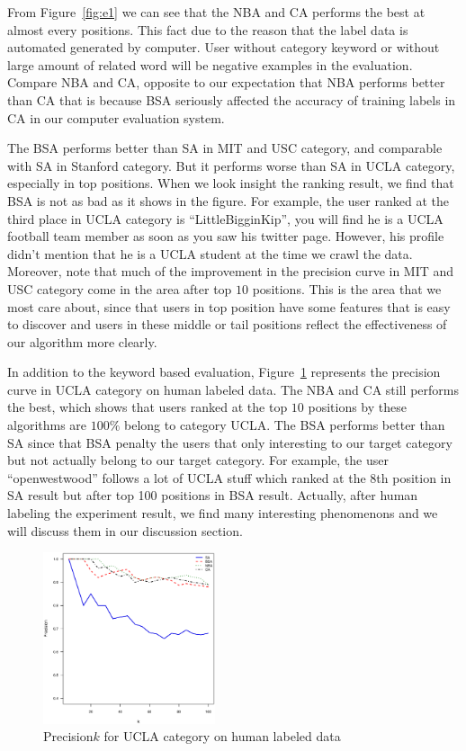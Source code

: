 \documentclass{article}
\begin{document}
From Figure~\ref{fig:e1} we can see that the NBA and CA performs the best at almost every positions. This fact due to the reason that the label data is automated generated by computer. User without category keyword or without large amount of related word will be negative examples in the evaluation. Compare NBA and CA, opposite to our expectation that NBA performs better than CA that is because BSA seriously affected the accuracy of training labels in CA in our computer evaluation system.

The BSA performs better than SA in MIT and USC category, and comparable with SA in Stanford category. But it performs worse than SA in UCLA category, especially in top positions. When we look insight the ranking result, we find that BSA is not as bad as it shows in the figure. For example, the user ranked at the third place in UCLA category is ``LittleBigginKip'', you will find he is a UCLA football team member as soon as you saw his twitter page. However, his profile didn't mention that he is a UCLA student at the time we crawl the data. Moreover, note that much of the improvement in the precision curve in MIT and USC category come in the area after top $10$ positions. This is the area that we most care about, since that users in top position have some features that is easy to discover and users in these middle or tail positions reflect the effectiveness of our algorithm more clearly.

In addition to the keyword based evaluation, Figure~\ref{fig:e2} represents the precision curve in UCLA category on human labeled data. The NBA and CA still performs the best, which shows that users ranked at the top $10$ positions by these algorithms are $100\%$ belong to category UCLA. The BSA performs better than SA since that BSA penalty the users that only interesting to our target category but not actually belong to our target category. For example, the user ``openwestwood'' follows a lot of UCLA stuff which ranked at the $8$th position in SA result but after top 100 positions in BSA result. Actually, after human labeling the experiment result, we find many interesting phenomenons and we will discuss them in our discussion section.
\begin{figure}[htbp]
\centering
\includegraphics[width=0.45\textwidth]{experiment/e1.ucla.pool.eps}
\caption{Precision\at$k$ for UCLA category on human labeled data}
\label{fig:e2}
\end{figure}
\end{document}
